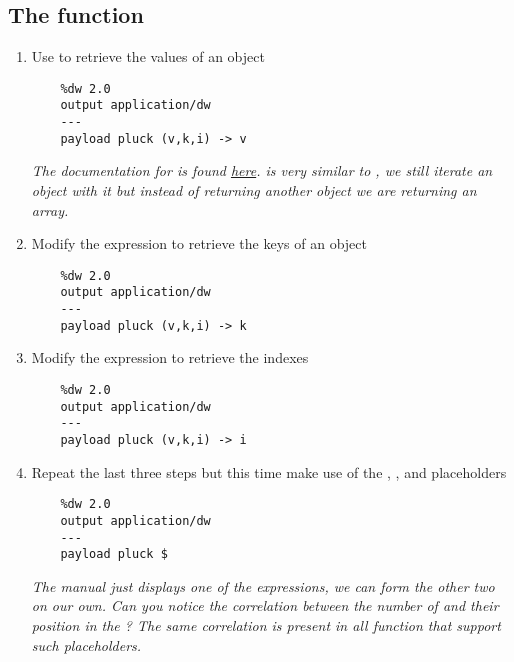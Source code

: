 \subsection{The  function}
\begin{enumerate}[resume*]
\item Use  to retrieve the values of an object
  \begin{verbatim}
    %dw 2.0
    output application/dw
    ---
    payload pluck (v,k,i) -> v
  \end{verbatim}
  \emph{
    The documentation for  is found \href{https://docs.mulesoft.com/mule-runtime/4.3/dw-core-functions-pluck}{here}.   is very similar to , we still iterate an object with it but instead of returning another object we are returning an array.
  }
\item Modify the expression to retrieve the keys of an object
  \begin{verbatim}
    %dw 2.0
    output application/dw
    ---
    payload pluck (v,k,i) -> k
  \end{verbatim}
\item Modify the expression to retrieve the indexes
  \begin{verbatim}
    %dw 2.0
    output application/dw
    ---
    payload pluck (v,k,i) -> i
  \end{verbatim}
\item Repeat the last three steps but this time make use of the \ttt{\$}, \ttt{\$\$}, and \ttt{\$\$\$} placeholders
  \begin{verbatim}
    %dw 2.0
    output application/dw
    ---
    payload pluck $
  \end{verbatim}
  \emph{
    The manual just displays one of the expressions, we can form the other two on our own.
    \newline
    Can you notice the correlation between the number of \ttt{\$} and their position in the \les{}?  The same correlation is present in all function that support such placeholders.
  }
\end{enumerate}

